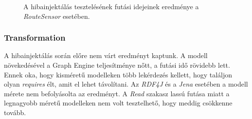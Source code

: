 \pagebreak
\begin{figure}[H]
	\centering
	\vspace*{-2cm}
	\caption{A hibainjektálás tesztelésének futási idejeinek eredménye a \emph{RouteSensor} esetében.}
	\label{fig:RouteSensorInjectResult}
\end{figure}

\subsubsection{Transformation}

A hibainjektálás során előre nem várt eredményt kaptunk. A modell növekedésével a Graph Engine teljesítménye nőtt, a futási idő rövidebb lett. Ennek oka, hogy kisméretű modelleken több lekérdezés kellett, hogy találjon olyan \emph{requires} élt, amit el lehet távolítani. Az \emph{RDF4J} és a \emph{Jena} esetében a modell mérete nem befolyásolta az eredményt. A \emph{Read} szakasz lassú futása miatt a legnagyobb méretű modelleken nem volt tesztelhető, hogy meddig csökkenne tovább.

